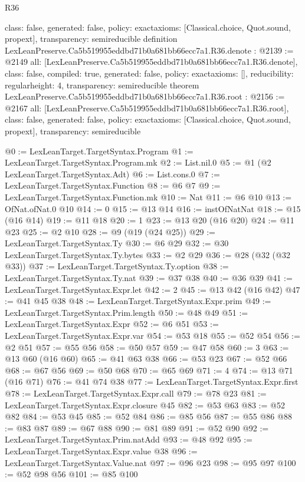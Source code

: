 \begin{lexlean}{R36}
\begin{coremodule}
{  class: false,
  generated: false,
  policy: exact{axioms: [Classical.choice, Quot.sound, propext]},
  transparency: semireducible
}
definition LexLeanPreserve.Ca5b519955eddbd71b0a681bb66ecc7a1.R36.denote : @2139 := @2149 {
  all: [LexLeanPreserve.Ca5b519955eddbd71b0a681bb66ecc7a1.R36.denote],
  class: false,
  compiled: true,
  generated: false,
  policy: exact{axioms: []},
  reducibility: regular{height: 4},
  transparency: semireducible
}
theorem LexLeanPreserve.Ca5b519955eddbd71b0a681bb66ecc7a1.R36.root : @2156 := @2167 {
  all: [LexLeanPreserve.Ca5b519955eddbd71b0a681bb66ecc7a1.R36.root],
  class: false,
  generated: false,
  policy: exact{axioms: [Classical.choice, Quot.sound, propext]},
  transparency: semireducible
}

@0 := LexLeanTarget.TargetSyntax.Program
@1 := LexLeanTarget.TargetSyntax.Program.mk
@2 := List.nil.{0}
@5 := @1 (@2 LexLeanTarget.TargetSyntax.Adt)
@6 := List.cons.{0}
@7 := LexLeanTarget.TargetSyntax.Function
@8 := @6 @7
@9 := LexLeanTarget.TargetSyntax.Function.mk
@10 := Nat
@11 := @6 @10
@13 := OfNat.ofNat.{0} @10
@14 := 0
@15 := @13 @14
@16 := instOfNatNat
@18 := @15 (@16 @14)
@19 := @11 @18
@20 := 1
@23 := @13 @20 (@16 @20)
@24 := @11 @23
@25 := @2 @10
@28 := @9 (@19 (@24 @25))
@29 := LexLeanTarget.TargetSyntax.Ty
@30 := @6 @29
@32 := @30 LexLeanTarget.TargetSyntax.Ty.bytes
@33 := @2 @29
@36 := @28 (@32 (@32 @33))
@37 := LexLeanTarget.TargetSyntax.Ty.option
@38 := LexLeanTarget.TargetSyntax.Ty.nat
@39 := @37 @38
@40 := @36 @39
@41 := LexLeanTarget.TargetSyntax.Expr.let
@42 := 2
@45 := @13 @42 (@16 @42)
@47 := @41 @45 @38
@48 := LexLeanTarget.TargetSyntax.Expr.prim
@49 := LexLeanTarget.TargetSyntax.Prim.length
@50 := @48 @49
@51 := LexLeanTarget.TargetSyntax.Expr
@52 := @6 @51
@53 := LexLeanTarget.TargetSyntax.Expr.var
@54 := @53 @18
@55 := @52 @54
@56 := @2 @51
@57 := @55 @56
@58 := @50 @57
@59 := @47 @58
@60 := 3
@63 := @13 @60 (@16 @60)
@65 := @41 @63 @38
@66 := @53 @23
@67 := @52 @66
@68 := @67 @56
@69 := @50 @68
@70 := @65 @69
@71 := 4
@74 := @13 @71 (@16 @71)
@76 := @41 @74 @38
@77 := LexLeanTarget.TargetSyntax.Expr.first
@78 := LexLeanTarget.TargetSyntax.Expr.call
@79 := @78 @23
@81 := LexLeanTarget.TargetSyntax.Expr.closure @45
@82 := @53 @63
@83 := @52 @82
@84 := @53 @45
@85 := @52 @84
@86 := @85 @56
@87 := @55 @86
@88 := @83 @87
@89 := @67 @88
@90 := @81 @89
@91 := @52 @90
@92 := LexLeanTarget.TargetSyntax.Prim.natAdd
@93 := @48 @92
@95 := LexLeanTarget.TargetSyntax.Expr.value @38
@96 := LexLeanTarget.TargetSyntax.Value.nat
@97 := @96 @23
@98 := @95 @97
@100 := @52 @98 @56
@101 := @85 @100

\end{coremodule}
\end{lexlean}
